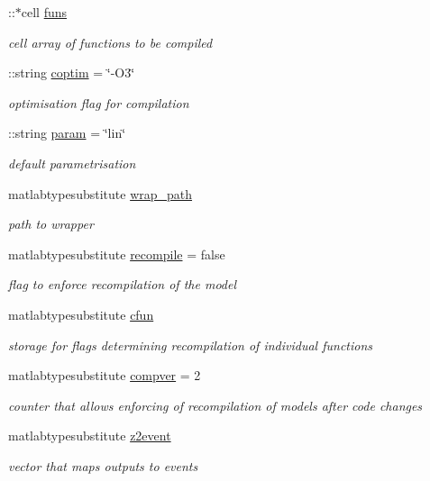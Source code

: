 \begin{DoxyCompactItemize}
\+::$\ast$cell \hyperlink{classamimodel_af80b2560853c3df2b09fef2a198cf5b8}{funs}
\begin{DoxyCompactList}\small\item\em cell array of functions to be compiled \end{DoxyCompactList}\item 
\+::string \hyperlink{classamimodel_ad99abcd270ac97546c46292ebc6c2e0a}{coptim} = \char`\"{}-\/O3\char`\"{}
\begin{DoxyCompactList}\small\item\em optimisation flag for compilation \end{DoxyCompactList}\item 
\+::string \hyperlink{classamimodel_a51f20d6b1b54a2eee3be0e8adc96a0ae}{param} = \char`\"{}lin\char`\"{}
\begin{DoxyCompactList}\small\item\em default parametrisation \end{DoxyCompactList}\item 
matlabtypesubstitute \hyperlink{classamimodel_a0b316a20054ba282555674d939a82406}{wrap\+\_\+path}
\begin{DoxyCompactList}\small\item\em path to wrapper \end{DoxyCompactList}\item 
matlabtypesubstitute \hyperlink{classamimodel_a8d2e824e03e32034b634a7c48f2a26c6}{recompile} = false
\begin{DoxyCompactList}\small\item\em flag to enforce recompilation of the model \end{DoxyCompactList}\item 
matlabtypesubstitute \hyperlink{classamimodel_afec809c626a350367485aa6aaea6b585}{cfun}
\begin{DoxyCompactList}\small\item\em storage for flags determining recompilation of individual functions \end{DoxyCompactList}\item 
matlabtypesubstitute \hyperlink{classamimodel_a0a9e4caf628a02e6db68e91c2de6f382}{compver} = 2
\begin{DoxyCompactList}\small\item\em counter that allows enforcing of recompilation of models after code changes \end{DoxyCompactList}\item 
\hypertarget{classamimodel_a7a7be015feeb7a346dceccd49e622b4b}{}matlabtypesubstitute \hyperlink{classamimodel_a7a7be015feeb7a346dceccd49e622b4b}{z2event}\label{classamimodel_a7a7be015feeb7a346dceccd49e622b4b}

\begin{DoxyCompactList}\small\item\em vector that maps outputs to events \end{DoxyCompactList}\end{DoxyCompactItemize}


